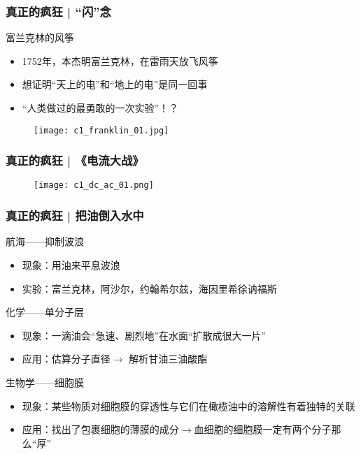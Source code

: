 \begin{frame}
  \frametitle{真正的疯狂 | “闪”念}
  \begin{block}{富兰克林的风筝}
    \begin{itemize}
      \item 1752年，本杰明\textbullet 富兰克林，在雷雨天放飞风筝
      \item 想证明“天上的电”和“地上的电”是同一回事
      \item “人类做过的最勇敢的一次实验”！？
    \end{itemize}
    \vspace{-1em}
    \begin{figure}
      \centering
      \texttt{[image: c1\_franklin\_01.jpg]}
    \end{figure}
  \end{block}
\end{frame}

\begin{frame}
  \frametitle{真正的疯狂 | 《电流大战》}
  \begin{figure}
    \centering
    \texttt{[image: c1\_dc\_ac\_01.png]}
  \end{figure}
\end{frame}

\begin{frame}
  \frametitle{真正的疯狂 | 把油倒入水中}
  \begin{block}{航海——抑制波浪}
    \begin{itemize}
      \item 现象：用油来平息波浪
      \item 实验：富兰克林，阿沙尔，约翰\textbullet 希尔兹，海因里希\textbullet 徐讷福斯
    \end{itemize}
  \end{block}
  \pause
  \begin{block}{化学——单分子层}
    \begin{itemize}
      \item 现象：一滴油会“急速、剧烈地”在水面“扩散成很大一片”
      \item 应用：估算分子直径$\longrightarrow$ 解析甘油三油酸酯
    \end{itemize}
  \end{block}
  \pause
  \begin{block}{生物学——细胞膜}
    \begin{itemize}
      \item 现象：某些物质对细胞膜的穿透性与它们在橄榄油中的溶解性有着独特的关联
      \item 应用：找出了包裹细胞的薄膜的成分$\longrightarrow$血细胞的细胞膜一定有两个分子那么“厚”
    \end{itemize}
  \end{block}
\end{frame}


